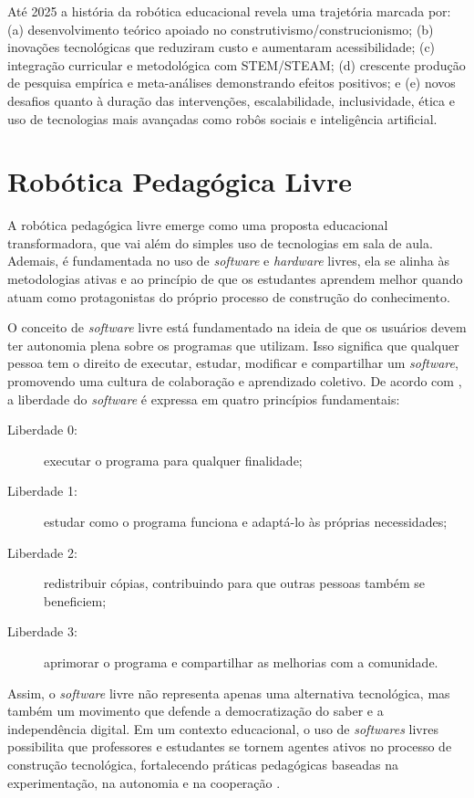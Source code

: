 \documentclass[portuguese]{textolivre}
\begin{document}
Até 2025 a história da robótica educacional revela uma trajetória marcada por: (a) desenvolvimento teórico apoiado no construtivismo/construcionismo; (b) inovações tecnológicas que reduziram custo e aumentaram acessibilidade; (c) integração curricular e metodológica com STEM/STEAM; (d) crescente produção de pesquisa empírica e meta-análises demonstrando efeitos positivos; e (e) novos desafios quanto à duração das intervenções, escalabilidade, inclusividade, ética e uso de tecnologias mais avançadas como robôs sociais e inteligência artificial.

\section{Robótica Pedagógica Livre}\label{sec-robotica}

A robótica pedagógica livre emerge como uma proposta educacional transformadora, que vai além do simples uso de tecnologias em sala de aula. Ademais, é fundamentada no uso de \textit{software} e \textit{hardware} livres, ela se alinha às metodologias ativas e ao princípio de que os estudantes aprendem melhor quando atuam como protagonistas do próprio processo de construção do conhecimento.

O conceito de \textit{software} livre está fundamentado na ideia de que os usuários devem ter autonomia plena sobre os programas que utilizam. Isso significa que qualquer pessoa tem o direito de executar, estudar, modificar e compartilhar um \textit{software}, promovendo uma cultura de colaboração e aprendizado coletivo. De acordo com \textcite{ref17}, a liberdade do \textit{software} é expressa em quatro princípios fundamentais:
\begin{description}
    \item[Liberdade 0:] executar o programa para qualquer finalidade;
    \item[Liberdade 1:] estudar como o programa funciona e adaptá-lo às próprias necessidades;
    \item[Liberdade 2:] redistribuir cópias, contribuindo para que outras pessoas também se beneficiem;
    \item[Liberdade 3:] aprimorar o programa e compartilhar as melhorias com a comunidade.
\end{description}


Assim, o \textit{software} livre não representa apenas uma alternativa tecnológica, mas também um movimento que defende a democratização do saber e a independência digital. Em um contexto educacional, o uso de \textit{softwares} livres possibilita que professores e estudantes se tornem agentes ativos no processo de construção tecnológica, fortalecendo práticas pedagógicas baseadas na experimentação, na autonomia e na cooperação \cite{ref5}.
\end{document}
